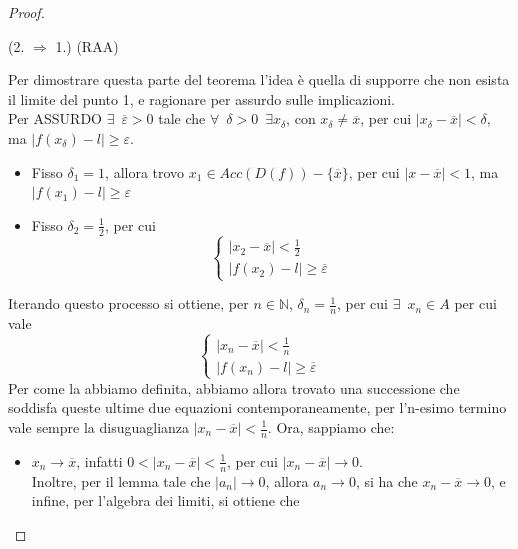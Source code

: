 \documentclass{article}
\theoremstyle{definition}
\begin{document}
\begin{proof}
    \begin{center}
        (2. $\Longrightarrow$ 1.) (RAA)
    \end{center}
    Per dimostrare questa parte del teorema l'idea è quella di supporre che non esista il limite del punto 1, e ragionare per assurdo sulle implicazioni.\\ Per ASSURDO
    $\exists \,\,\, \overline{\varepsilon}>0$ tale che $\forall \,\,\, \delta>0 \,\,\,\exists  x_{\delta} $, con $x_\delta \neq \overline{x}$, per cui $|x_\delta-\overline{x}|<\delta$, ma $|f(x_\delta)-l| \geqslant \varepsilon$.
    \begin{itemize}
        \item Fisso $\delta_1=1$, allora trovo $x_1 \in Acc(D(f))-\{\overline{x}\}$, per cui $|x-\overline{x}|<1$, ma $|f(x_1)-l|\geqslant \varepsilon$
        \item Fisso $\delta_2=\frac{1}{2}$, per cui
        \begin{equation}
            \begin{cases}
                |x_2-\overline{x}|<\frac{1}{2} \\
                |f(x_2)-l| \geqslant \overline{\varepsilon}
            \end{cases}
        \end{equation}
    \end{itemize}
Iterando questo processo si ottiene, per $n \in \mathbb{N}$, $\delta_n=\frac{1}{n}$, per cui $\exists \,\,\, x_n \in A$ per cui vale
\begin{equation}
    \begin{cases}
        |x_n-\overline{x}|<\frac{1}{n} \\
        |f(x_n)-l| \geqslant \overline{\varepsilon}
    \end{cases}
\end{equation}
    Per come la abbiamo definita, abbiamo allora trovato una successione che soddisfa queste ultime due equazioni contemporaneamente, per l'n-esimo termino vale sempre la disuguaglianza $|x_n-\overline{x}|<\frac{1}{n}$.
    Ora, sappiamo che:
    \begin{itemize}
        \item $x_n \to \overline{x}$, infatti $0<|x_n-\overline{x}|<\frac{1}{n}$, per cui $|x_n-\overline{x}| \to 0$.
        \\
        Inoltre, per il lemma tale che $|a_n|\to 0$, allora $a_n \to 0$, si ha che $x_n-\overline{x} \to 0$, e infine, per l'algebra dei limiti, si ottiene che

\end{itemize}
\end{proof}
\end{document}
